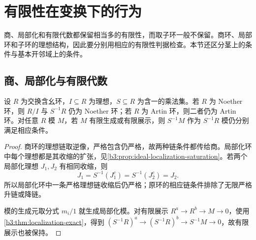 
\section{有限性在变换下的行为}
\label{b3:sec:0304}

商、局部化和有限代数都保留相当多的有限性，而取子环一般不保留。商环、局部环和子环的理想结构，因此要分别用相应的有限性判据检查。本节还区分茎上的条件与基本开邻域上的条件。

\subsection{商、局部化与有限代数}
\label{b3:subsec:0304:01}

\begin{proposition}\label{b3:prop:chain-conditions-localization}
	设 \(R\) 为交换含幺环，\(I\subseteq R\) 为理想，\(S\subseteq R\) 为含一的乘法集。若 \(R\) 为 Noether 环，则 \(R/I\) 与 \(S^{-1}R\) 仍为 Noether 环；若 \(R\) 为 Artin 环，则二者仍为 Artin 环。对任意 \(R\) 模 \(M\)，若 \(M\) 有限生成或有限展示，则 \(S^{-1}M\) 作为 \(S^{-1}R\) 模仍分别满足相应条件。
\end{proposition}
\begin{proof}
	商环的理想链取逆像，严格包含仍严格，故两种链条件都传给商。局部化环中每个理想都是其收缩的扩张，见\cref{b3:prop:ideal-localization-saturation}。若两个局部化理想 \(J_1,J_2\) 有相同收缩，则
	\[
		J_1=S^{-1}(J_1^c)=S^{-1}(J_2^c)=J_2.
	\]
	所以局部化环中一条严格理想链收缩后仍严格；原环的相应链条件排除了无限严格升链或降链。

	模的生成元取分式 \(m_i/1\) 就生成局部化模。对有限展示 \(R^a\rightarrow R^b\rightarrow M\rightarrow0\)，使用\cref{b3:thm:localization-exact}，得到 \((S^{-1}R)^a\rightarrow(S^{-1}R)^b\rightarrow S^{-1}M\rightarrow0\)，故有限展示也被保持。
\end{proof}

